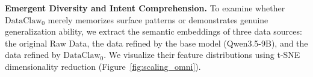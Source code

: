 \documentclass{llmxive}
\begin{document}






\textbf{Emergent Diversity and Intent Comprehension.}
To examine whether $\text{DataClaw}_0$ merely memorizes surface patterns or demonstrates genuine generalization ability, 
we extract the semantic embeddings of three data sources: the original Raw Data, 
the data refined by the base model (Qwen3.5-9B), and the data refined by $\text{DataClaw}_0$. 
We visualize their feature distributions using t-SNE dimensionality reduction (Figure~\ref{fig:scaling_omni}). 
\end{document}
